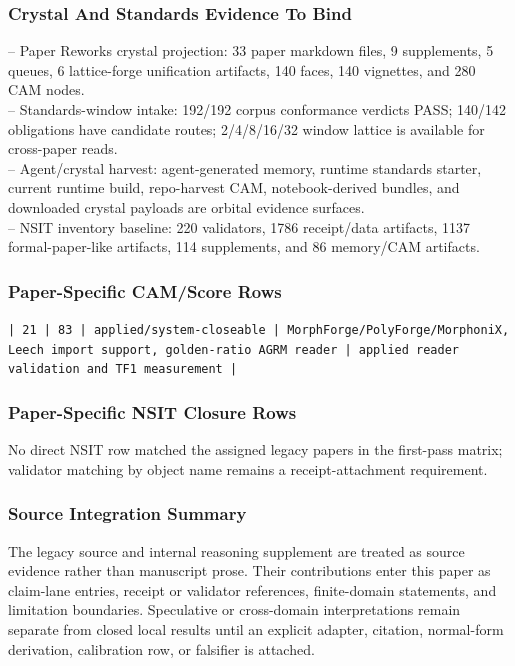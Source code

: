 \documentclass[11pt]{article}
\begin{document}
\subsubsection*{Crystal And Standards Evidence To Bind}

\noindent{}-- Paper Reworks crystal projection: 33 paper markdown files, 9 supplements, 5 queues, 6 lattice-forge unification artifacts, 140 faces, 140 vignettes, and 280 CAM nodes.\\
\noindent{}-- Standards-window intake: 192/192 corpus conformance verdicts PASS; 140/142 obligations have candidate routes; 2/4/8/16/32 window lattice is available for cross-paper reads.\\
\noindent{}-- Agent/crystal harvest: agent-generated memory, runtime standards starter, current runtime build, repo-harvest CAM, notebook-derived bundles, and downloaded crystal payloads are orbital evidence surfaces.\\
\noindent{}-- NSIT inventory baseline: 220 validators, 1786 receipt/data artifacts, 1137 formal-paper-like artifacts, 114 supplements, and 86 memory/CAM artifacts.\\

\subsubsection*{Paper-Specific CAM/Score Rows}

\noindent\texttt{| 21 | 83 | applied/system-closeable | MorphForge/PolyForge/MorphoniX, Leech import support, golden-ratio AGRM reader | applied reader validation and TF1 measurement |}\\

\subsubsection*{Paper-Specific NSIT Closure Rows}

No direct NSIT row matched the assigned legacy papers in the first-pass matrix; validator matching by object name remains a receipt-attachment requirement.

\subsubsection*{Source Integration Summary}

The legacy source and internal reasoning supplement are treated as source
evidence rather than manuscript prose. Their contributions enter this paper as
claim-lane entries, receipt or validator references, finite-domain statements,
and limitation boundaries. Speculative or cross-domain interpretations remain
separate from closed local results until an explicit adapter, citation,
normal-form derivation, calibration row, or falsifier is attached.
\end{document}
